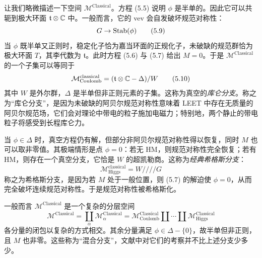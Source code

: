 让我们略微描述一下空间 $\mathcal{M}^{\text{Classical}}$。方程 (5.5) 说明 $\phi$ 是半单的。因此它可以共轭到极大环面 $\mathfrak{t}\otimes\mathbb{C}$ 中。一般而言，它的 vev 会自发破坏规范对称性：
\begin{equation}
G\to\operatorname{Stab}(\phi)
\tag{5.9}
\end{equation}
当 $\phi$ 既半单又正则时，稳定化子恰为嘉当环面的正规化子，未破缺的规范群恰为极大环面 $T$，其李代数为 $\mathfrak{t}$。此时方程 (5.6) 与 (5.7) 给出 $M=0$。于是 $\mathcal{M}^{\text{Classical}}$ 的一个子集可以等同于
\begin{equation}
\mathcal{M}^{\text{classical}}_{\text{Coulomb}}=(\mathfrak{t}\otimes\mathbb{C}-\Delta)/W
\tag{5.10}
\end{equation}
其中 $W$ 是外尔群，$\Delta$ 是半单但非正则元素的子集。这称为真空的\emph{库仑分支}。称之为“库仑分支”，是因为未破缺的阿贝尔规范对称性意味着 LEET 中存在无质量的阿贝尔规范场，它们会对理论中带电的粒子施加电磁力；特别地，两个静止的带电粒子将感受到长程库仑力。


当 $\phi\in\Delta$ 时，真空方程仍有解，但部分非阿贝尔规范对称性得以恢复，同时 $M$ 也可以取非零值。其极端情形是点 $\phi=0$：若无 HM，则规范对称性完全恢复；若有 HM，则存在一个真空分支，它恰是 $W$ 的超凯勒商。这称为\emph{经典希格斯分支}：
\begin{equation}
\mathcal{M}^{\text{classical}}_{\text{Higgs}}=W/\!/\!/\!/G
\tag{5.11}
\end{equation}
称之为希格斯分支，是因为若 $M$ 处于一般位置，则 (5.7) 的解迫使 $\phi=0$，从而完全破坏连续规范对称性。于是规范对称性被希格斯化。

一般而言 $\mathcal{M}^{\text{Classical}}$ 是一个复杂的分层空间
\begin{equation}
\mathcal{M}^{\text{Classical}}=\coprod_{\alpha}\mathcal{M}^{\text{Classical}}_{\alpha}
=\mathcal{M}^{\text{Classical}}_{\text{Coulomb}}\amalg\cdots\amalg\mathcal{M}^{\text{Classical}}_{\text{Higgs}}
\tag{5.12}
\end{equation}
各分量的闭包以复杂的方式相交。其余分量满足 $\phi\in\Delta-\{0\}$，故半单但非正则，且 $M$ 也非零。这些称为“混合分支”，文献中对它们的考察并不比上述分支少多少。

